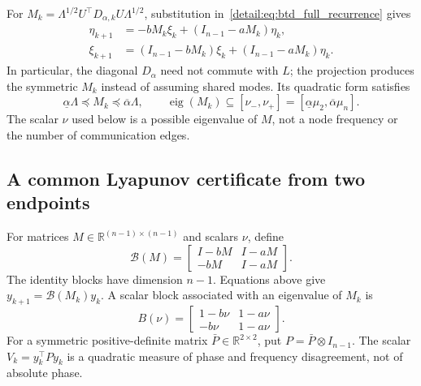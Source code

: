 For $M_k=\Lambda^{1/2}U^\top D_{\alpha,k}U\Lambda^{1/2}$,
substitution in~\eqref{detail:eq:btd_full_recurrence} gives
\begin{align}
 \eta_{k+1}&=-bM_k\xi_k+(I_{n-1}-aM_k)\eta_k,\nonumber\\
 \xi_{k+1}&=(I_{n-1}-bM_k)\xi_k+(I_{n-1}-aM_k)\eta_k.
 \label{detail:eq:btd_d_projected_recurrence}
\end{align}
In particular, the diagonal $D_\alpha$ need not commute with $L$; the
projection produces the symmetric $M_k$ instead of assuming shared modes.
Its quadratic form satisfies
\begin{equation}
 \underline\alpha\Lambda\preceq M_k\preceq\overline\alpha\Lambda,
 \qquad \operatorname{eig}(M_k)\subseteq
 [\nu_-,\nu_+]=[\underline\alpha\mu_2,\overline\alpha\mu_n].
 \label{detail:eq:btd_d_sector_matrix}
\end{equation}
The scalar $\nu$ used below is a possible eigenvalue of $M$, not a node
frequency or the number of communication edges.

\subsection{A common Lyapunov certificate from two endpoints}
\label{detail:subsec:btd_ref_certificate}

For matrices $M\in\mathbb R^{(n-1)\times(n-1)}$ and scalars $\nu$,
define
\begin{equation}
 \mathcal B(M)=\begin{bmatrix}I-bM&I-aM\\-bM&I-aM\end{bmatrix}.
 \label{detail:eq:btd_matrix_dynamics}
\end{equation}
The identity blocks have dimension $n-1$. Equations above give
$y_{k+1}=\mathcal B(M_k)y_k$. A scalar block associated with an eigenvalue
of $M_k$ is
\begin{equation}
 B(\nu)=\begin{bmatrix}1-b\nu&1-a\nu\\-b\nu&1-a\nu\end{bmatrix}.
 \label{detail:eq:btd_scalar_block}
\end{equation}
For a symmetric positive-definite matrix $\bar P\in\mathbb R^{2\times2}$,
put $P=\bar P\otimes I_{n-1}$. The scalar
$V_k=y_k^\top P y_k$ is a quadratic measure of phase and frequency
disagreement, not of absolute phase.

